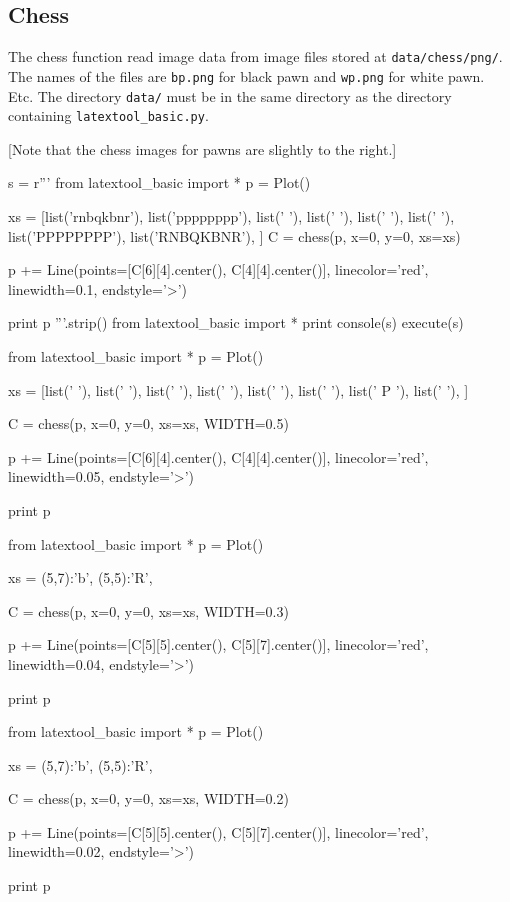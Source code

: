\subsection{Chess}

The chess function read image data from image files stored at
\verb!data/chess/png/!.
The names of the files are \verb!bp.png! for black pawn
and \verb!wp.png! for white pawn. Etc.
The directory \verb!data/! must be in the same directory as the directory
containing \verb!latextool_basic.py!.

[Note that the chess images for pawns are slightly to the right.]


\begin{python}
s = r'''
from latextool_basic import *
p = Plot()

xs = [list('rnbqkbnr'),
      list('pppppppp'),
      list('        '),
      list('        '),
      list('        '),
      list('        '),
      list('PPPPPPPP'),
      list('RNBQKBNR'),
      ]
C = chess(p, x=0, y=0, xs=xs)

p += Line(points=[C[6][4].center(), C[4][4].center()], linecolor='red',
          linewidth=0.1, endstyle='>')

print p
'''.strip()
from latextool_basic import *
print console(s)
execute(s)
\end{python}



\begin{python}
from latextool_basic import *
p = Plot()

xs = [list('        '),
      list('        '),
      list('        '),
      list('        '),
      list('        '),
      list('        '),
      list('    P   '),
      list('        '),
      ]
      
C = chess(p, x=0, y=0, xs=xs, WIDTH=0.5)

p += Line(points=[C[6][4].center(), C[4][4].center()], linecolor='red',
          linewidth=0.05, endstyle='>')

print p
\end{python}


\begin{python}
from latextool_basic import *
p = Plot()

xs = {(5,7):'b',
      (5,5):'R',
      }
      
C = chess(p, x=0, y=0, xs=xs, WIDTH=0.3)

p += Line(points=[C[5][5].center(), C[5][7].center()], linecolor='red',
          linewidth=0.04, endstyle='>')

print p
\end{python}

\begin{python}
from latextool_basic import *
p = Plot()

xs = {(5,7):'b',
      (5,5):'R',
      }
      
C = chess(p, x=0, y=0, xs=xs, WIDTH=0.2)

p += Line(points=[C[5][5].center(), C[5][7].center()], linecolor='red',
          linewidth=0.02, endstyle='>')

print p
\end{python}
